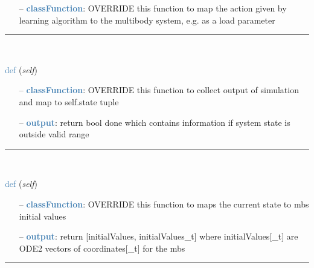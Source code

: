 \begin{itemize}[leftmargin=1.4cm]
\begin{itemize}[leftmargin=1.4cm]
\begin{itemize}[leftmargin=0.7cm]
\item[--]\textcolor{steelblue}{\bf classFunction}: OVERRIDE this function to map the action given by learning algorithm to the multibody system, e.g. as a load parameter
\vspace{12pt}\end{itemize}
%
\noindent\rule{8cm}{0.75pt}\vspace{1pt} \\ 
\begin{flushleft}
\noindent \textcolor{steelblue}{def {\bf {}}}\label{sec:artificialIntelligence:OpenAIGymInterfaceEnv(Env):Output2StateAndDone}
({\it self})
\end{flushleft}
\setlength{\itemindent}{0.7cm}
\begin{itemize}[leftmargin=0.7cm]
\item[--]\textcolor{steelblue}{\bf classFunction}: OVERRIDE this function to collect output of simulation and map to self.state tuple
\item[--]\textcolor{steelblue}{\bf output}: return bool done which contains information if system state is outside valid range
\vspace{12pt}\end{itemize}
%
\noindent\rule{8cm}{0.75pt}\vspace{1pt} \\ 
\begin{flushleft}
\noindent \textcolor{steelblue}{def {\bf {}}}\label{sec:artificialIntelligence:OpenAIGymInterfaceEnv(Env):State2InitialValues}
({\it self})
\end{flushleft}
\setlength{\itemindent}{0.7cm}
\begin{itemize}[leftmargin=0.7cm]
\item[--]\textcolor{steelblue}{\bf classFunction}: OVERRIDE this function to maps the current state to mbs initial values
\item[--]\textcolor{steelblue}{\bf output}: return [initialValues, initialValues\_t] where initialValues[\_t] are ODE2 vectors of coordinates[\_t] for the mbs
\vspace{12pt}\end{itemize}
%
\noindent\rule{8cm}{0.75pt}\vspace{1pt} \\ 

\end{itemize}
\end{itemize}
